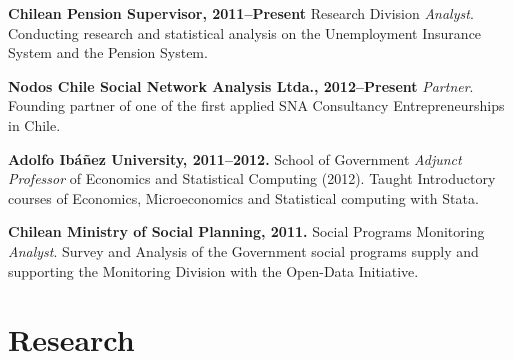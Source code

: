 \documentclass[letterpaper, 12pt]{article}
\renewenvironment{itemize}{
  \begin{list}{}{
    \setlength{\leftmargin}{0.45cm}
  }
}{
  \end{list}
}
\begin{document}
\begin{itemize}
\item \textbf{Chilean Pension Supervisor, 2011--Present} Research Division \emph{Analyst}.
Conducting research and statistical analysis on the Unemployment Insurance System and the Pension System.
\item \textbf{Nodos Chile Social Network Analysis Ltda., 2012--Present} \emph{Partner}.
Founding partner of one of the first applied SNA Consultancy Entrepreneurships in Chile.
\item \textbf{Adolfo Ib\'a\~nez University, 2011--2012.} School of Government \emph{Adjunct Professor} of Economics and Statistical Computing (2012). 
Taught Introductory courses of Economics, Microeconomics and Statistical computing with Stata.
\item \textbf{Chilean Ministry of Social Planning, 2011.} Social Programs Monitoring \emph{Analyst}.
Survey and Analysis of the Government social programs supply and supporting the Monitoring Division with the Open-Data Initiative.
\end{itemize}

\section*{Research}
\end{document}
